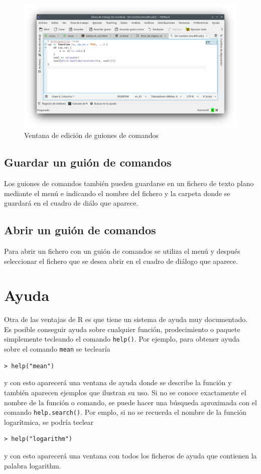 \begin{figure}[htp]
\begin{center}
  \includegraphics[width=\textwidth]{capitulos/introduccion/img/guiones_comandos}
  \caption{Ventana de edición de guiones de comandos}
  \label{g:guiones_comandos}
\end{center}
\end{figure}


\subsection{Guardar un guión de comandos}
Los guiones de comandos también pueden guardarse en un fichero de texto plano mediante el menú
 e indicando el nombre del fichero y la carpeta donde se guardará en el
cuadro de diálo que aparece.


\subsection{Abrir un guión de comandos}
Para abrir un fichero con un guión de comandos se utiliza el menú  y
después seleccionar el fichero que se desea abrir en el cuadro de diálogo que aparece. 


\section{Ayuda}
Otra de las ventajas de R es que tiene un sistema de ayuda muy documentado. Es posible conseguir ayuda sobre cualquier
función, prodecimiento o paquete simplemente tecleando el comando \lstinline{help()}. Por ejemplo, para obtener ayuda
sobre el comando \lstinline{mean} se teclearía
\begin{lstlisting}
> help("mean")
\end{lstlisting}
y con esto aparecerá una ventana de ayuda donde se describe la función y también aparecen ejemplos que ilustran su uso. 
Si no se conoce exactamente el nombre de la función o comando, se puede hacer una búsqueda aproximada con el comando
\lstinline{help.search()}. Por emplo, si no se recuerda el nombre de la función logarítmica, se podría
teclear
\begin{lstlisting}
> help("logarithm")
\end{lstlisting}
y con esto aparecerá una ventana con todos los ficheros de ayuda que contienen la palabra logarithm.

